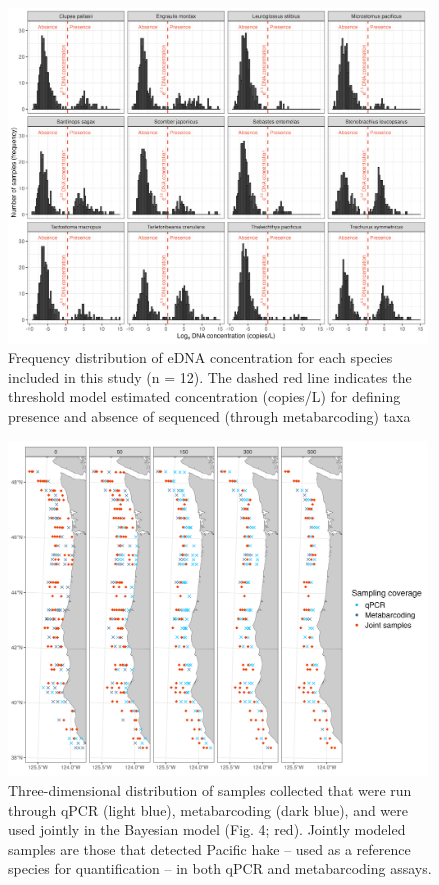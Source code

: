 \documentclass{article}
\begin{document}
\begin{figure}
\centering
\includegraphics[width=0.99\textwidth]{plots/6_Supplementary_Figure_2.jpg}
\caption{Frequency distribution of eDNA concentration for each species included in this study (n = 12). The dashed red line indicates the threshold model estimated concentration (copies/L) for defining presence and absence of sequenced (through metabarcoding) taxa}
\end{figure}

\begin{figure}
\centering
\includegraphics[width=0.99\textwidth]{plots/7_Supplementary_Figure_3.jpg}
\caption{Three-dimensional distribution of samples collected that were run through qPCR (light blue), metabarcoding (dark blue), and were used jointly in the Bayesian model (Fig. 4; red). Jointly modeled samples are those that detected Pacific hake -- used as a reference species for quantification -- in both qPCR and metabarcoding assays.}
\end{figure}
\end{document}
